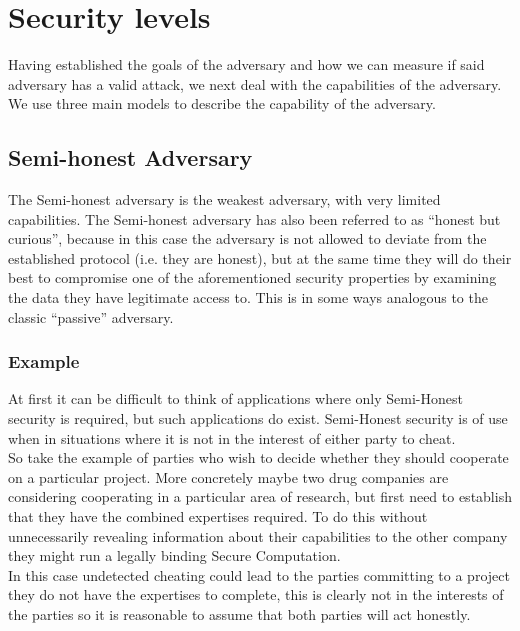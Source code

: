 \documentclass[ %
                    author={Nicholas Tutte},
                supervisor={Prof. Nigel Smart},
                    degree={MEng},
                     title={Secure Two Party Computation},
                  subtitle={A practical comparison of recent protocols},
                      type={Research - GG1K},
                      year={2015} ]{dissertation}
\begin{document}
		\section{Security levels}\label{sub:SecurityLevels}
			Having established the goals of the adversary and how we can measure if said adversary has a valid attack, we next deal with the capabilities of the adversary. We use three main models to describe the capability of the adversary.

			\subsection{Semi-honest Adversary}
				The Semi-honest adversary is the weakest adversary, with very limited capabilities. The Semi-honest adversary has also been referred to as ``honest but curious'', because in this case the adversary is not allowed to deviate from the established protocol (i.e. they are honest), but at the same time they will do their best to compromise one of the aforementioned security properties by examining the data they have legitimate access to. This is in some ways analogous to the classic ``passive'' adversary.

				\subsubsection{Example}

					At first it can be difficult to think of applications where only Semi-Honest security is required, but such applications do exist. Semi-Honest security is of use when in situations where it is not in the interest of either party to cheat.\\

					So take the example of parties who wish to decide whether they should cooperate on a particular project. More concretely maybe two drug companies are considering cooperating in a particular area of research, but first need to establish that they have the combined expertises required. To do this without unnecessarily revealing information about their capabilities to the other company they might run a legally binding Secure Computation.\\
					
					In this case undetected cheating could lead to the parties committing to a project they do not have the expertises to complete, this is clearly not in the interests of the parties so it is reasonable to assume that both parties will act honestly.\\
\end{document}
